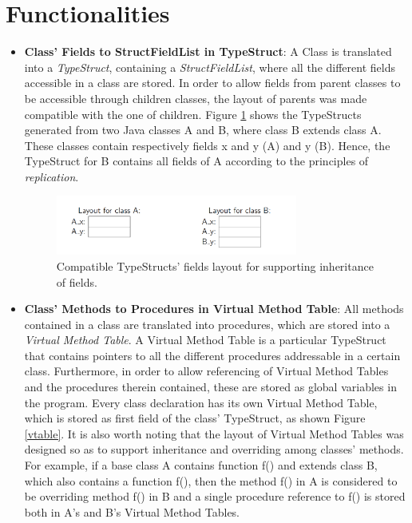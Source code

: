 \documentclass[paper=a4, fontsize=11pt]{scrartcl}
\numberwithin{equation}{section}		%
\numberwithin{figure}{section}			%
\numberwithin{table}{section}				%
\begin{document}
\section*{Functionalities}
\begin{itemize}
	\item \textbf{Class' Fields to StructFieldList in TypeStruct}: A Class is translated into a \textit{TypeStruct}, containing a \textit{StructFieldList}, where all the different fields accessible in a class are stored. In order to allow fields from parent classes to be accessible through children classes, the layout of parents was made compatible with the one of children. Figure \ref{classes_fields} shows the TypeStructs generated from two Java classes A and B, where class B extends class A. These classes contain respectively fields x and y (A) and y (B). Hence, the TypeStruct for B contains all fields of A according to the principles of \textit{replication}.
	
	\begin{figure}
		\includegraphics[width=0.75\textwidth]{classes_layout.png}	
		\caption{Compatible TypeStructs' fields layout for supporting inheritance of fields.}
		\label{classes_fields}

	\end{figure}
	
	
	\item \textbf{Class' Methods to Procedures in Virtual Method Table}: All methods contained in a class are translated into procedures, which are stored into a \textit{Virtual Method Table}. A Virtual Method Table is a particular TypeStruct that contains pointers to all the different procedures addressable in a certain class. Furthermore, in order to allow referencing of Virtual Method Tables and the procedures therein contained, these are stored as global variables in the program. Every class declaration has its own Virtual Method Table, which is stored as first field of the class' TypeStruct, as shown Figure \ref{vtable}. It is also worth noting that the layout of Virtual Method Tables was designed so as to support inheritance and overriding among classes' methods. For example, if a base class A contains function f() and extends class B, which also contains a function f(), then the method f() in A is considered to be overriding method f() in B and a single procedure reference to f() is stored both in A's and B's Virtual Method Tables. 


\end{itemize}
\end{document}
